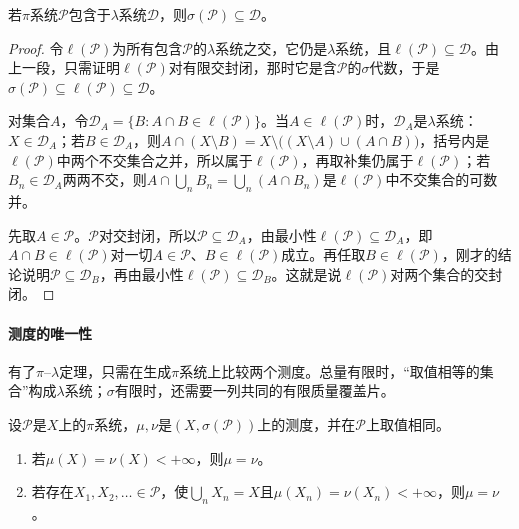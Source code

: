 \begin{theorem}[$\pi$--$\lambda$定理]
\label{thm:measure-pi-lambda}
若$\pi$系统$\mathcal P$包含于$\lambda$系统$\mathcal D$，则$\sigma(\mathcal P)\subseteq\mathcal D$。
\end{theorem}

\begin{proof}
令$\ell(\mathcal P)$为所有包含$\mathcal P$的$\lambda$系统之交，它仍是$\lambda$系统，且$\ell(\mathcal P)\subseteq\mathcal D$。由上一段，只需证明$\ell(\mathcal P)$对有限交封闭，那时它是含$\mathcal P$的$\sigma$代数，于是$\sigma(\mathcal P)\subseteq\ell(\mathcal P)\subseteq\mathcal D$。

对集合$A$，令$\mathcal D_A=\{B:A\cap B\in\ell(\mathcal P)\}$。当$A\in\ell(\mathcal P)$时，$\mathcal D_A$是$\lambda$系统：$X\in\mathcal D_A$；若$B\in\mathcal D_A$，则$A\cap(X\setminus B)=X\setminus\bigl((X\setminus A)\cup(A\cap B)\bigr)$，括号内是$\ell(\mathcal P)$中两个不交集合之并，所以属于$\ell(\mathcal P)$，再取补集仍属于$\ell(\mathcal P)$；若$B_n\in\mathcal D_A$两两不交，则$A\cap\bigcup_nB_n=\bigcup_n(A\cap B_n)$是$\ell(\mathcal P)$中不交集合的可数并。

先取$A\in\mathcal P$。$\mathcal P$对交封闭，所以$\mathcal P\subseteq\mathcal D_A$，由最小性$\ell(\mathcal P)\subseteq\mathcal D_A$，即$A\cap B\in\ell(\mathcal P)$对一切$A\in\mathcal P$、$B\in\ell(\mathcal P)$成立。再任取$B\in\ell(\mathcal P)$，刚才的结论说明$\mathcal P\subseteq\mathcal D_B$，再由最小性$\ell(\mathcal P)\subseteq\mathcal D_B$。这就是说$\ell(\mathcal P)$对两个集合的交封闭。
\end{proof}

\paragraph{测度的唯一性}
有了$\pi$--$\lambda$定理，只需在生成$\pi$系统上比较两个测度。总量有限时，“取值相等的集合”构成$\lambda$系统；$\sigma$有限时，还需要一列共同的有限质量覆盖片。

\begin{theorem}[生成$\pi$系统上的唯一性]
\label{thm:measure-uniqueness}
设$\mathcal P$是$X$上的$\pi$系统，$\mu,\nu$是$(X,\sigma(\mathcal P))$上的测度，并在$\mathcal P$上取值相同。
\begin{enumerate}
 \item 若$\mu(X)=\nu(X)<+\infty$，则$\mu=\nu$。
 \item 若存在$X_1,X_2,\dots\in\mathcal P$，使$\bigcup_nX_n=X$且$\mu(X_n)=\nu(X_n)<+\infty$，则$\mu=\nu$。
\end{enumerate}
\end{theorem}


